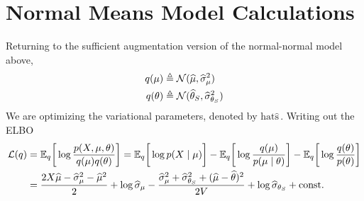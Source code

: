 \documentclass{article}
\begin{document}
\newpage

\section{Normal Means Model Calculations}
\label{normal}

 Returning to the sufficient augmentation version of the normal-normal model above, 
\begin{align}
q(\mu)
&\triangleq \mathcal{N}(\widehat\mu,\widehat\sigma_\mu^2) \\
q(\theta)
&\triangleq \mathcal{N}(\widehat\theta_S,\widehat\sigma_{\theta_S}^2)
\end{align}
We are optimizing the variational parameters, denoted by $\text{hat}\widehat{\text{s}}\,$. Writing out the ELBO
\begin{align}
\cl(q)
&=\EE_{q}\bigg[\log \frac{p(X,\mu,\theta)}{q(\mu)q(\theta)}\bigg] 
=  \EE_{q}\bigg[\log p(X\mid \mu)\bigg]
-  \EE_{q}\bigg[\log\frac{q(\mu)}{p(\mu\mid \theta)} \bigg]
-  \EE_{q}\bigg[\log \frac{q(\theta)}{p(\theta)}\bigg] \\
&=  \frac{2X\widehat\mu -  \widehat\sigma_{\mu}^{2} - \widehat\mu^{2}}{2} %
+\log\widehat\sigma_\mu - \frac{\widehat\sigma_\mu^{2}+\widehat\sigma_{\theta_S}^{2} + (\widehat\mu-\widehat\theta)^2}{2V}
+\log \widehat{\sigma}_{\theta_S} 
+ \text{const.}
\end{align}
\end{document}
